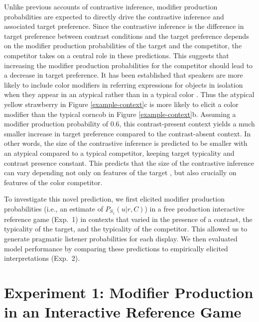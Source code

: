 \documentclass[10pt,letterpaper]{article}
\newcommand{\jd}[1]{\textcolor{Purple}{[jd: #1]}}
\newcommand{\figref}[1]{Figure \ref{#1}}
\begin{document}
Unlike previous accounts of contrastive inference, modifier production probabilities are expected to directly drive the contrastive inference and associated target preference. Since the contrastive inference is the difference in target preference between contrast conditions and the target preference depends on the modifier production probabilities of the target and the competitor, the competitor takes on a central role in these predictions. This suggests that increasing the modifier production probabilities for the competitor should lead to a decrease in target preference. It has been established that speakers are more likely to include color modifiers in referring expressions for objects in isolation when they appear in an atypical rather than in a typical color \cite{Rubio-Fernandez:2016,Westerbeek:2015,Degen:inpress}. Thus the atypical yellow strawberry in \figref{example-context}c is more likely to elicit a color modifier than the typical corncob in \figref{example-context}b. Assuming a modifier production probability of 0.6, this contrast-present context yields a much smaller increase in target preference compared to the contrast-absent context. In other words, the size of the contrastive inference is predicted to be smaller with an atypical compared to a typical competitor, keeping target typicality and contrast presence constant. This predicts that the size of the contrastive inference can vary depending not only on features of the target \cite<as previously shown by>{Sedivy:2003, Rubio-Fernandez:2019}, but also crucially on features of the color competitor. 


To investigate this novel prediction, we first elicited modifier production probabilities (i.e., an estimate of $P_{S_1}(u|r,C)$) in a free production interactive reference game (Exp.~1) in contexts that varied in the presence of a contrast, the typicality of the target, and the typicality of the competitor. This allowed us to generate pragmatic listener probabilities for each display. We then evaluated model performance by comparing these predictions to empirically elicited interpretations (Exp.~2).


\section{Experiment 1: Modifier Production in an Interactive Reference Game}
\end{document}
